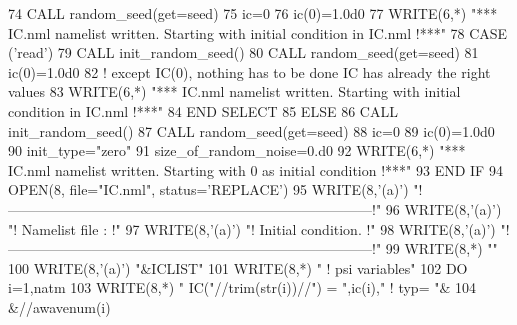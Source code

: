 \begin{DoxyCode}
74            \textcolor{keyword}{CALL }random\_seed(get=seed)
75            ic=0
76            ic(0)=1.0d0
77            \textcolor{keyword}{WRITE}(6,*) \textcolor{stringliteral}{"*** IC.nml namelist written. Starting with initial condition in IC.nml !***"}
78          \textcolor{keywordflow}{CASE} (\textcolor{stringliteral}{'read'})
79            \textcolor{keyword}{CALL }init\_random\_seed()
80            \textcolor{keyword}{CALL }random\_seed(get=seed)
81            ic(0)=1.0d0
82            \textcolor{comment}{! except IC(0), nothing has to be done IC has already the right values}
83            \textcolor{keyword}{WRITE}(6,*) \textcolor{stringliteral}{"*** IC.nml namelist written. Starting with initial condition in IC.nml !***"}
84 \textcolor{keywordflow}{       END SELECT}
85     \textcolor{keywordflow}{ELSE}
86        \textcolor{keyword}{CALL }init\_random\_seed()
87        \textcolor{keyword}{CALL }random\_seed(get=seed)
88        ic=0
89        ic(0)=1.0d0
90        init\_type=\textcolor{stringliteral}{"zero"}
91        size\_of\_random\_noise=0.d0
92        \textcolor{keyword}{WRITE}(6,*) \textcolor{stringliteral}{"*** IC.nml namelist written. Starting with 0 as initial condition !***"}
93 \textcolor{keywordflow}{    END IF}
94     \textcolor{keyword}{OPEN}(8, file=\textcolor{stringliteral}{"IC.nml"}, status=\textcolor{stringliteral}{'REPLACE'})
95     \textcolor{keyword}{WRITE}(8,\textcolor{stringliteral}{'(a)'}) \textcolor{stringliteral}{"!------------------------------------------------------------------------------!"}
96     \textcolor{keyword}{WRITE}(8,\textcolor{stringliteral}{'(a)'}) \textcolor{stringliteral}{"! Namelist file :                                                              !"}
97     \textcolor{keyword}{WRITE}(8,\textcolor{stringliteral}{'(a)'}) \textcolor{stringliteral}{"! Initial condition.                                                           !"}
98     \textcolor{keyword}{WRITE}(8,\textcolor{stringliteral}{'(a)'}) \textcolor{stringliteral}{"!------------------------------------------------------------------------------!"}
99     \textcolor{keyword}{WRITE}(8,*) \textcolor{stringliteral}{""}
100     \textcolor{keyword}{WRITE}(8,\textcolor{stringliteral}{'(a)'}) \textcolor{stringliteral}{"&ICLIST"}
101     \textcolor{keyword}{WRITE}(8,*) \textcolor{stringliteral}{" ! psi variables"}
102     \textcolor{keywordflow}{DO} i=1,natm
103        \textcolor{keyword}{WRITE}(8,*) \textcolor{stringliteral}{" IC("}//trim(str(i))//\textcolor{stringliteral}{") = "},ic(i),\textcolor{stringliteral}{"   ! typ= "}&
104             &//awavenum(i)%

\end{DoxyCode}

